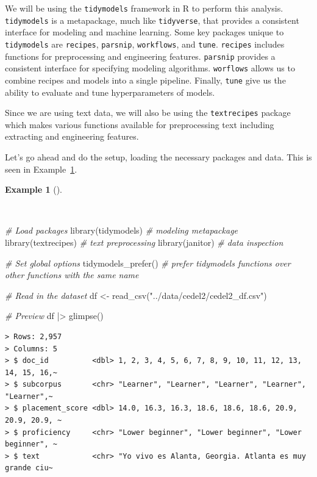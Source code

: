 \documentclass[
  letterpaper,
  DIV=11,
  numbers=noendperiod]{scrreprt}
\newenvironment{Shaded}{\begin{snugshade}}{\end{snugshade}}
\newcommand{\CommentTok}[1]{\textcolor[rgb]{0.00,0.00,0.00}{\textit{#1}}}
\newcommand{\FunctionTok}[1]{\textcolor[rgb]{0.00,0.00,0.00}{#1}}
\newcommand{\NormalTok}[1]{\textcolor[rgb]{0.00,0.00,0.00}{#1}}
\newcommand{\OtherTok}[1]{\textcolor[rgb]{0.00,0.00,0.00}{#1}}
\newcommand{\SpecialCharTok}[1]{\textcolor[rgb]{0.00,0.00,0.00}{#1}}
\newcommand{\StringTok}[1]{\textcolor[rgb]{0.00,0.00,0.00}{#1}}
\theoremstyle{definition}
\newtheorem{example}{Example}[chapter]
\theoremstyle{remark}
\begin{document}
We will be using the \texttt{tidymodels} framework in R to perform this
analysis. \texttt{tidymodels} is a metapackage, much like
\texttt{tidyverse}, that provides a consistent interface for modeling
and machine learning. Some key packages unique to \texttt{tidymodels}
are \texttt{recipes}, \texttt{parsnip}, \texttt{workflows}, and
\texttt{tune}. \texttt{recipes} includes functions for preprocessing and
engineering features. \texttt{parsnip} provides a consistent interface
for specifying modeling algorithms. \texttt{worflows} allows us to
combine recipes and models into a single pipeline. Finally,
\texttt{tune} give us the ability to evaluate and tune hyperparameters
of models.

Since we are using text data, we will also be using the
\texttt{textrecipes} package which makes various functions available for
preprocessing text including extracting and engineering features.

Let's go ahead and do the setup, loading the necessary packages and
data. This is seen in Example~\ref{exm-pda-packages-data}.

\begin{example}[]\protect\hypertarget{exm-pda-packages-data}{}\label{exm-pda-packages-data}

~

\begin{Shaded}
\begin{Highlighting}[]
\CommentTok{\# Load packages}
\FunctionTok{library}\NormalTok{(tidymodels)   }\CommentTok{\# modeling metapackage}
\FunctionTok{library}\NormalTok{(textrecipes)  }\CommentTok{\# text preprocessing}
\FunctionTok{library}\NormalTok{(janitor)      }\CommentTok{\# data inspection}

\CommentTok{\# Set global options}
\FunctionTok{tidymodels\_prefer}\NormalTok{()   }\CommentTok{\# prefer tidymodels functions over other functions with the same name}

\CommentTok{\# Read in the dataset}
\NormalTok{df }\OtherTok{\textless{}{-}}
  \FunctionTok{read\_csv}\NormalTok{(}\StringTok{"../data/cedel2/cedel2\_df.csv"}\NormalTok{)}

\CommentTok{\# Preview}
\NormalTok{df }\SpecialCharTok{|\textgreater{}} \FunctionTok{glimpse}\NormalTok{()}
\end{Highlighting}
\end{Shaded}

\begin{verbatim}
> Rows: 2,957
> Columns: 5
> $ doc_id          <dbl> 1, 2, 3, 4, 5, 6, 7, 8, 9, 10, 11, 12, 13, 14, 15, 16,~
> $ subcorpus       <chr> "Learner", "Learner", "Learner", "Learner", "Learner",~
> $ placement_score <dbl> 14.0, 16.3, 16.3, 18.6, 18.6, 18.6, 20.9, 20.9, 20.9, ~
> $ proficiency     <chr> "Lower beginner", "Lower beginner", "Lower beginner", ~
> $ text            <chr> "Yo vivo es Alanta, Georgia. Atlanta es muy grande ciu~
\end{verbatim}

\end{example}
\end{document}
